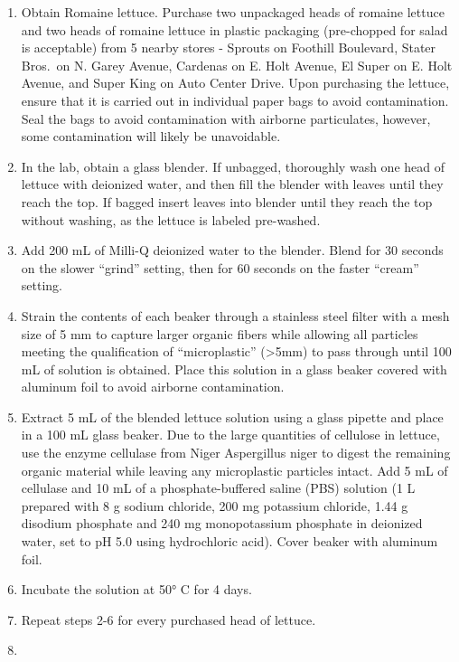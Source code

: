 \documentclass[]{article}
\providecommand{\tightlist}{%
  \setlength{\itemsep}{0pt}\setlength{\parskip}{0pt}}
\begin{document}
\begin{enumerate}
\def\labelenumi{\arabic{enumi}.}
\tightlist
\item
  Obtain Romaine lettuce. Purchase two unpackaged heads of romaine
  lettuce and two heads of romaine lettuce in plastic packaging
  (pre-chopped for salad is acceptable) from 5 nearby stores - Sprouts
  on Foothill Boulevard, Stater Bros.~on N. Garey Avenue, Cardenas on E.
  Holt Avenue, El Super on E. Holt Avenue, and Super King on Auto Center
  Drive. Upon purchasing the lettuce, ensure that it is carried out in
  individual paper bags to avoid contamination. Seal the bags to avoid
  contamination with airborne particulates, however, some contamination
  will likely be unavoidable.~
\item
  In the lab, obtain a glass blender. If unbagged, thoroughly wash one
  head of lettuce with deionized water, and then fill the blender with
  leaves until they reach the top. If bagged insert leaves into blender
  until they reach the top without washing, as the lettuce is labeled
  pre-washed.~
\item
  Add 200 mL of Milli-Q deionized water to the blender. Blend for 30
  seconds on the slower ``grind'' setting, then for 60 seconds on the
  faster ``cream'' setting.~
\item
  Strain the contents of each beaker through a stainless steel filter
  with a mesh size of 5 mm to capture larger organic fibers while
  allowing all particles meeting the qualification of ``microplastic''
  (\textgreater{}5mm) to pass through until 100 mL of solution is
  obtained. Place this solution in a glass beaker covered with aluminum
  foil to avoid airborne contamination.~
\item
  Extract 5 mL of the blended lettuce solution using a glass pipette and
  place in a 100 mL glass beaker. Due to the large quantities of
  cellulose in lettuce, use the enzyme cellulase from Niger Aspergillus
  niger to digest the remaining organic material while leaving any
  microplastic particles intact. Add 5 mL of cellulase and 10 mL of a
  phosphate-buffered saline (PBS) solution (1 L prepared with 8 g sodium
  chloride, 200 mg potassium chloride, 1.44 g disodium phosphate and 240
  mg monopotassium phosphate in deionized water, set to pH 5.0 using
  hydrochloric acid). Cover beaker with aluminum foil.~
\item
  Incubate the solution at 50° C for 4 days.~
\item
  Repeat steps 2-6 for every purchased head of lettuce.~
\item

\end{enumerate}
\end{document}

